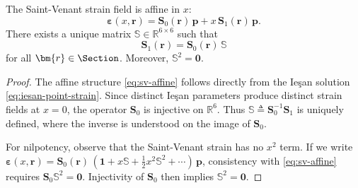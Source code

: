 \begin{Aside}
\begin{lemma}
\label{lem:universal-generator}
The Saint-Venant strain field is affine in $x$:
\begin{equation}
\bm{\varepsilon}(x, \bm{r}) = \mathbf{S}_0(\bm{r})\,\bm{p} + x\,\mathbf{S}_1(\bm{r})\,\bm{p}.
\label{eq:sv-affine}
\end{equation}
There exists a unique matrix $\mathbb{S} \in \mathbb{R}^{6 \times 6}$ such that
\begin{equation}
\mathbf{S}_1(\bm{r}) = \mathbf{S}_0(\bm{r})\,\mathbb{S}
\label{eq:S1-S0-A}
\end{equation}
for all $\bm{r} \in \Section$. 
Moreover, $\mathbb{S}^2 = \mathbf{0}$.
\end{lemma}

\begin{proof}
The affine structure \eqref{eq:sv-affine} follows directly from the Ieşan 
solution \eqref{eq:iesan-point-strain}. Since distinct Ieşan parameters 
produce distinct strain fields at $x = 0$, the operator $\mathbf{S}_0$ is 
injective on $\mathbb{R}^6$. 
Thus $\mathbb{S} \triangleq \mathbf{S}_0^{-1}\mathbf{S}_1$ 
is uniquely defined, where the inverse is understood on the image of $\mathbf{S}_0$.

For nilpotency, observe that the Saint-Venant strain has no $x^2$ term. 
If we write $\bm{\varepsilon}(x, \bm{r}) = \mathbf{S}_0(\bm{r})\,(\mathbf{1} + x\mathbb{S} + \tfrac{1}{2}x^2\mathbb{S}^2 + \cdots)\,\bm{p}$, 
consistency with \eqref{eq:sv-affine} requires $\mathbf{S}_0\mathbb{S}^2 = \mathbf{0}$. 
Injectivity of $\mathbf{S}_0$ then implies $\mathbb{S}^2 = \mathbf{0}$.
\end{proof}
\end{Aside}


